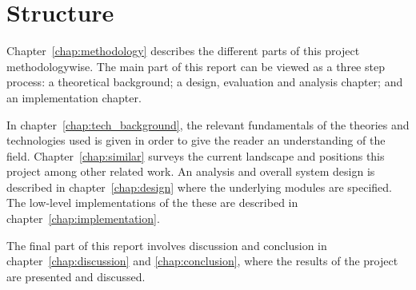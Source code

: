 \section{Structure}
  \label{sec:structure}

Chapter~\ref{chap:methodology} describes the different parts of this project methodologywise. The main part of this report can be viewed as a three step process: a theoretical background; a design, evaluation and analysis chapter; and an implementation chapter.

In chapter~\ref{chap:tech_background}, the relevant fundamentals of the theories and technologies used is given in order to give the reader an understanding of the field. Chapter~\ref{chap:similar} surveys the current landscape and positions this project among other related work. An analysis and overall system design is described in chapter~\ref{chap:design} where the underlying modules are specified. The low-level implementations of the these are described in chapter~\ref{chap:implementation}.

The final part of this report involves discussion and conclusion in chapter~\ref{chap:discussion} and \ref{chap:conclusion}, where the results of the project are presented and discussed.
